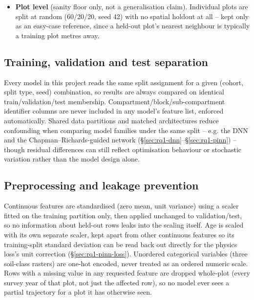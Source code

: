 \begin{itemize}
  closer to the test year) is also defined as a secondary check, with validation deliberately
  assigned to the earliest available year rather than a middle year.
\item \textbf{Plot level} (sanity floor only, not a generalisation claim). Individual plots are
  split at random (60/20/20, seed 42) with no spatial holdout at all -- kept only as an easy-case
  reference, since a held-out plot's nearest neighbour is typically a training plot metres away.
\end{itemize}

\subsection{Training, validation and test separation}
\label{sec:train-val-test}

Every model in this project reads the same split assignment for a given (cohort, split type,
seed) combination, so results are always compared on identical train/validation/test membership.
Compartment/block/sub-compartment identifier columns are never included in any model's feature
list, enforced automatically. Shared data partitions and matched architectures reduce confounding
when comparing model families under the same split -- e.g. the DNN and the Chapman--Richards-guided
network (\S\ref{sec:rq1-dnn}--\S\ref{sec:rq1-pinn}) -- though residual differences can still
reflect optimisation behaviour or stochastic variation rather than the model design alone.

\subsection{Preprocessing and leakage prevention}
\label{sec:preprocessing}

Continuous features are standardised (zero mean, unit variance) using a scaler fitted on the
training partition only, then applied unchanged to validation/test, so no information about
held-out rows leaks into the scaling itself. Age is scaled with its own separate scaler, kept
apart from other continuous features so its training-split standard deviation can be read back out
directly for the physics loss's unit correction (\S\ref{sec:rq1-pinn-loss}). Unordered categorical
variables (three soil-class rasters) are one-hot encoded, never treated as an ordered numeric
scale. Rows with a missing value in any requested feature are dropped whole-plot (every survey
year of that plot, not just the affected row), so no model ever sees a partial trajectory for a
plot it has otherwise seen.


